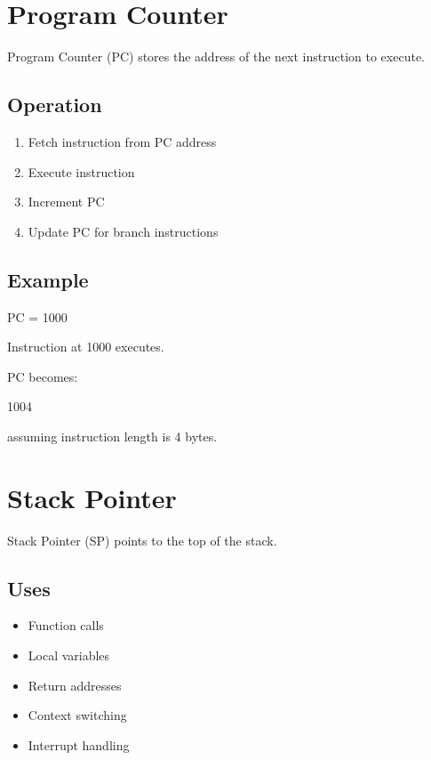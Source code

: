 \section{Program Counter}

Program Counter (PC) stores the address of the next instruction to execute.

\subsection{Operation}

\begin{enumerate}
\item Fetch instruction from PC address
\item Execute instruction
\item Increment PC
\item Update PC for branch instructions
\end{enumerate}

\subsection{Example}

\begin{center}
PC = 1000
\end{center}

Instruction at 1000 executes.

PC becomes:

\begin{center}
1004
\end{center}

assuming instruction length is 4 bytes.

\section{Stack Pointer}

Stack Pointer (SP) points to the top of the stack.

\subsection{Uses}

\begin{itemize}
\item Function calls
\item Local variables
\item Return addresses
\item Context switching
\item Interrupt handling
\end{itemize}

